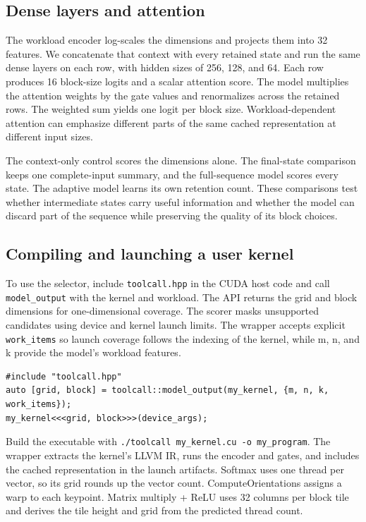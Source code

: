 \documentclass[11pt,letterpaper]{article}
\begin{document}
\subsection{Dense layers and attention}

The workload encoder log-scales the dimensions and projects them into 32 features. We concatenate that
context with every retained state and run the same dense layers on each row, with hidden sizes of 256, 128,
and 64. Each row produces 16 block-size logits and a scalar attention score. The model multiplies the
attention weights by the gate values and renormalizes across the retained rows. The weighted sum yields one
logit per block size. Workload-dependent attention can emphasize different parts of the same cached
representation at different input sizes.

The context-only control scores the dimensions alone. The final-state comparison keeps one complete-input
summary, and the full-sequence model scores every state. The adaptive model learns its own retention count.
These comparisons test whether intermediate states carry useful information and whether the model can
discard part of the sequence while preserving the quality of its block choices.

\subsection{Compiling and launching a user kernel}

To use the selector, include \texttt{toolcall.hpp} in the CUDA host code and call \texttt{model\_output}
with the kernel and workload. The API returns the grid and block dimensions for one-dimensional coverage.
The scorer masks unsupported candidates using device and kernel launch limits. The wrapper accepts explicit
\texttt{work\_items} so launch coverage follows the indexing of the kernel, while m, n, and k provide the
model's workload features.

\begin{verbatim}
#include "toolcall.hpp"
auto [grid, block] = toolcall::model_output(my_kernel, {m, n, k, work_items});
my_kernel<<<grid, block>>>(device_args);
\end{verbatim}

Build the executable with \texttt{./toolcall my\_kernel.cu -o my\_program}. The wrapper extracts the
kernel's LLVM IR, runs the encoder and gates, and includes the cached representation in the launch
artifacts. Softmax uses one thread per vector, so its grid rounds up the vector count. ComputeOrientations
assigns a warp to each keypoint. Matrix multiply + ReLU uses 32 columns per block tile and derives the tile
height and grid from the predicted thread count.
\end{document}
